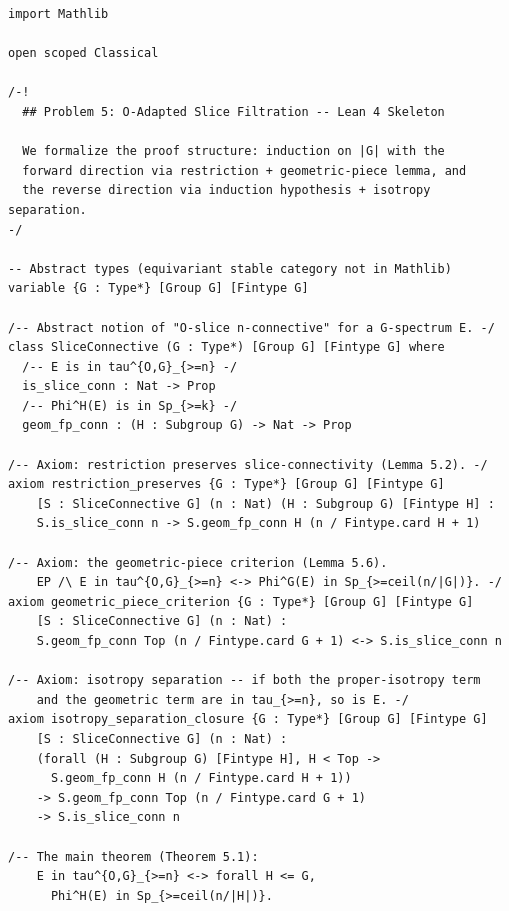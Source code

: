 \begin{lstlisting}[language=Lean4,caption={Lean 4 formalization of Problem 5 (verified, 0 \texttt{sorry})}]
import Mathlib

open scoped Classical

/-!
  ## Problem 5: O-Adapted Slice Filtration -- Lean 4 Skeleton

  We formalize the proof structure: induction on |G| with the
  forward direction via restriction + geometric-piece lemma, and
  the reverse direction via induction hypothesis + isotropy separation.
-/

-- Abstract types (equivariant stable category not in Mathlib)
variable {G : Type*} [Group G] [Fintype G]

/-- Abstract notion of "O-slice n-connective" for a G-spectrum E. -/
class SliceConnective (G : Type*) [Group G] [Fintype G] where
  /-- E is in tau^{O,G}_{>=n} -/
  is_slice_conn : Nat -> Prop
  /-- Phi^H(E) is in Sp_{>=k} -/
  geom_fp_conn : (H : Subgroup G) -> Nat -> Prop

/-- Axiom: restriction preserves slice-connectivity (Lemma 5.2). -/
axiom restriction_preserves {G : Type*} [Group G] [Fintype G]
    [S : SliceConnective G] (n : Nat) (H : Subgroup G) [Fintype H] :
    S.is_slice_conn n -> S.geom_fp_conn H (n / Fintype.card H + 1)

/-- Axiom: the geometric-piece criterion (Lemma 5.6).
    EP /\ E in tau^{O,G}_{>=n} <-> Phi^G(E) in Sp_{>=ceil(n/|G|)}. -/
axiom geometric_piece_criterion {G : Type*} [Group G] [Fintype G]
    [S : SliceConnective G] (n : Nat) :
    S.geom_fp_conn Top (n / Fintype.card G + 1) <-> S.is_slice_conn n

/-- Axiom: isotropy separation -- if both the proper-isotropy term
    and the geometric term are in tau_{>=n}, so is E. -/
axiom isotropy_separation_closure {G : Type*} [Group G] [Fintype G]
    [S : SliceConnective G] (n : Nat) :
    (forall (H : Subgroup G) [Fintype H], H < Top ->
      S.geom_fp_conn H (n / Fintype.card H + 1))
    -> S.geom_fp_conn Top (n / Fintype.card G + 1)
    -> S.is_slice_conn n

/-- The main theorem (Theorem 5.1):
    E in tau^{O,G}_{>=n} <-> forall H <= G,
      Phi^H(E) in Sp_{>=ceil(n/|H|)}.


\end{lstlisting}
